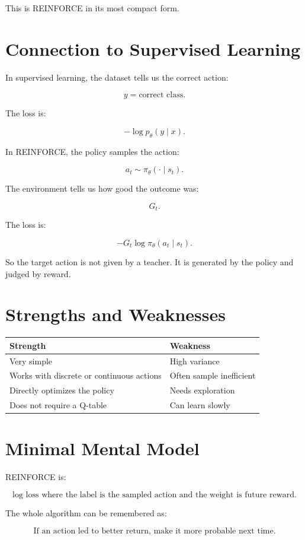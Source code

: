 \documentclass[11pt]{article}
\begin{document}
This is REINFORCE in its most compact form.

\section{Connection to Supervised Learning}

In supervised learning, the dataset tells us the correct action:

\[
y = \text{correct class}.
\]

The loss is:

\[
-\log p_\theta(y \mid x).
\]

In REINFORCE, the policy samples the action:

\[
a_t \sim \pi_\theta(\cdot \mid s_t).
\]

The environment tells us how good the outcome was:

\[
G_t.
\]

The loss is:

\[
-G_t \log \pi_\theta(a_t \mid s_t).
\]

So the target action is not given by a teacher.
It is generated by the policy and judged by reward.

\section{Strengths and Weaknesses}

\begin{center}
\begin{tabular}{ll}
\toprule
Strength & Weakness \\
\midrule
Very simple & High variance \\
Works with discrete or continuous actions & Often sample inefficient \\
Directly optimizes the policy & Needs exploration \\
Does not require a Q-table & Can learn slowly \\
\bottomrule
\end{tabular}
\end{center}

\section{Minimal Mental Model}

REINFORCE is:

\[
\boxed{
\text{log loss where the label is the sampled action and the weight is future reward.}
}
\]

The whole algorithm can be remembered as:

\[
\boxed{
\text{If an action led to better return, make it more probable next time.}
}
\]
\end{document}
